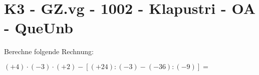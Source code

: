 \section{K3 - GZ.vg - 1002 - Klapustri - OA - QueUnb}

\begin{beispiel}{0} %
				Berechne folgende Rechnung:
				
				\begin{center}
				$(+4)\cdot(-3)\cdot(+2)-[(+24):(-3)-(-36):(-9)]=$
				\end{center}
				
\end{beispiel}